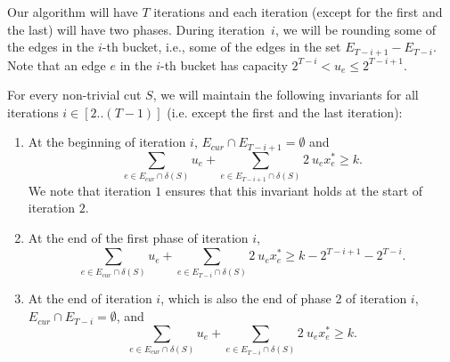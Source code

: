 \documentclass[11pt]{article}
\newcommand{\alphatwo}{2}
\begin{document}
{\begin{figure}[htb]
{
}
\end{figure}


Our algorithm will have $T$ iterations and each iteration (except
for the first and the last) will have two phases. During iteration~$i$,
we will be rounding some of the edges in the $i$-th bucket,
i.e., some of the edges in the set $E_{T-i+1} - E_{T-i}$.
Note that an edge $e$ in the $i$-th bucket has capacity $2^{T-i}<u_e\leq2^{T-i+1}$.

For every non-trivial cut $S$, we will maintain the following invariants for all iterations $i \in [2..(T-1)]$ (i.e. except the first and the last iteration):

\begin{enumerate}
    \item At the beginning of iteration $i$, $E_{cur} \cap E_{T-i+1} = \emptyset$ and
	$$\sum_{e\in E_{cur} \cap \delta(S)}u_e + \sum_{e\in E_{T-i + 1} \cap \delta(S)} \alphatwo\ u_ex^*_e \geq k.$$
We note that iteration $1$ ensures that this invariant holds at the start of iteration $2$.

    \item At the end of the first phase of iteration $i$,
    \[
    \sum_{e\in E_{cur} \cap \delta(S)}u_e + \sum_{e\in E_{T-i} \cap \delta(S)}\alphatwo\  u_ex^*_e \geq k-2^{T-i+1} - 2^{T-i}.
    \]

    \item At the end of iteration $i$, which is also the end of phase
    2 of iteration $i$, $E_{cur} \cap E_{T-i} = \emptyset$, and
    $$\sum_{e\in E_{cur} \cap \delta(S)}u_e + \sum_{e\in E_{T-i} \cap \delta(S)} \alphatwo\  u_ex^*_e \geq k.$$
\end{enumerate}

}
\end{document}
